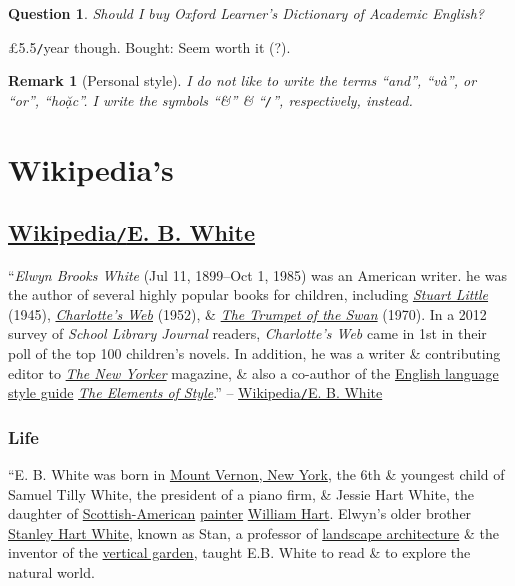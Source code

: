 \documentclass[oneside]{book}
\numberwithin{equation}{section}
\newtheorem{question}{Question}[chapter]
\newtheorem{remark}{Remark}[chapter]
\begin{document}
\begin{question}
	Should I buy Oxford Learner's Dictionary of Academic English?
\end{question}
\pounds 5.5\texttt{/}year though. Bought: Seem worth it (?).

\begin{remark}[Personal style]
	I do not like to write the terms ``and'', ``và'', or ``or'', ``hoặc''. I write the symbols ``\&'' \& ``\emph{\texttt{/}}'', respectively, instead.
\end{remark}


\chapter{Wikipedia's}

\section{\href{https://en.wikipedia.org/wiki/E._B._White}{Wikipedia\texttt{/}E. B. White}}
``\textit{Elwyn Brooks White} (Jul 11, 1899--Oct 1, 1985) was an American writer. he was the author of several highly popular books for children, including \href{https://en.wikipedia.org/wiki/Stuart_Little}{\textit{Stuart Little}} (1945), \href{https://en.wikipedia.org/wiki/Charlotte%27s_Web}{\textit{Charlotte's Web}} (1952), \& \href{https://en.wikipedia.org/wiki/The_Trumpet_of_the_Swan}{\textit{The Trumpet of the Swan}} (1970). In a 2012 survey of \textit{School Library Journal} readers, \textit{Charlotte's Web} came in 1st in their poll of the top 100 children's novels. In addition, he was a writer \& contributing editor to \href{https://en.wikipedia.org/wiki/The_New_Yorker}{\textit{The New Yorker}} magazine, \& also a co-author of the \href{https://en.wikipedia.org/wiki/English_language}{English language} \href{https://en.wikipedia.org/wiki/Style_guide}{style guide} \href{https://en.wikipedia.org/wiki/The_Elements_of_Style}{\textit{The Elements of Style}}.'' -- \href{https://en.wikipedia.org/wiki/E._B._White}{Wikipedia\texttt{/}E. B. White}

\subsection{Life}
``E. B. White was born in \href{https://en.wikipedia.org/wiki/Mount_Vernon,_New_York}{Mount Vernon, New York}, the 6th \& youngest child of Samuel Tilly White, the president of a piano firm, \& Jessie Hart White, the daughter of \href{https://en.wikipedia.org/wiki/Scottish-American}{Scottish-American} \href{https://en.wikipedia.org/wiki/Painter}{painter} \href{https://en.wikipedia.org/wiki/William_Hart_(painter)}{William Hart}. Elwyn's older brother \href{https://en.wikipedia.org/wiki/Stanley_Hart_White}{Stanley Hart White}, known as Stan, a professor of \href{https://en.wikipedia.org/wiki/Landscape_architecture}{landscape architecture} \& the inventor of the \href{https://en.wikipedia.org/wiki/Green_wall}{vertical garden}, taught E.B. White to read \& to explore the natural world.
\end{document}
